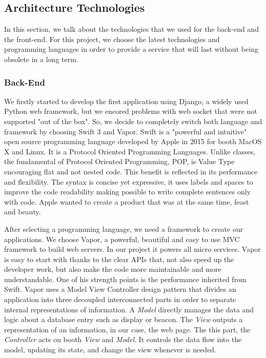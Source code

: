 \documentclass[]{usiinfbachelorproject}
\begin{document}
\subsection{Architecture Technologies}
In this section, we talk about the technologies that we used for the back-end and the front-end. For this project, we choose the latest technologies and programming languages in order to provide a service that will last without being obsolete in a long term.
\subsubsection{Back-End}
We firstly started to develop the first application using Django, a widely used Python web framework, but we encored problems with web socket that were not supported "out of the box".
So, we decide to completely switch both language and framework by choosing Swift 3 and Vapor.
Swift is a "powerful and intuitive" open source programming language developed by Apple in 2015 for booth MacOS X and Linux. It is a Protocol Oriented Programming Languages.
Unlike classes, the fundamental of Protocol Oriented Programming, POP, is Value Type encouraging flat and not nested code. This benefit is reflected in its performance and flexibility.
The syntax is concise yet expressive, it uses labels and spaces to improve the code readability making possible to write complete sentences only with code. Apple wanted to create a product that was at the same time, feast and beauty.

After selecting a programming language, we need a framework to create our applications. We choose Vapor, a powerful, beautiful and easy to use MVC framework to build web servers. In our project it powers all micro services.
Vapor is easy to start with thanks to the clear APIs that, not also speed up the developer work, but also make the code more maintainable and more understandable. One of his strength points is the performance inherited from Swift.
Vapor uses a Model View Controller design pattern that divides an application into three decoupled interconnected parts in order to separate internal representations of information. A \emph{Model} directly manages the data and logic about a database entry such as display or beacon. The \emph{View} outputs a representation of an information, in our case, the web page. The this part, the \emph{Controller} acts on booth \emph{View} and \emph{Model}. It controls the data flow into the model, updating its state, and change the view whenever is needed.
\end{document}
